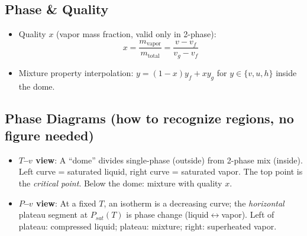 \documentclass[10pt]{article}
\begin{document}
\begin{multicols}{2}

\subsection{Phase \& Quality}
\begin{itemize}
    \item Quality $x$ (vapor mass fraction, valid only in 2-phase):
    \[
    x=\frac{m_{\text{vapor}}}{m_{\text{total}}}=\frac{v-v_f}{v_g - v_f}
    \]
    \item Mixture property interpolation: $y = (1-x)y_f + x y_g$ for $y\in\{v,u,h\}$ inside the dome.
\end{itemize}

\subsection{Phase Diagrams (how to recognize regions, no figure needed)}
\begin{itemize}
    \item \textbf{$T$--$v$ view}: A “dome” divides single-phase (outside) from 2-phase mix (inside). Left curve = saturated liquid, right curve = saturated vapor. The top point is the \emph{critical point}. Below the dome: mixture with quality $x$.
    \item \textbf{$P$--$v$ view}: At a fixed $T$, an isotherm is a decreasing curve; the \emph{horizontal} plateau segment at $P_{\!sat}(T)$ is phase change (liquid$\leftrightarrow$vapor). Left of plateau: compressed liquid; plateau: mixture; right: superheated vapor.
\end{itemize}


\end{multicols}
\end{document}
